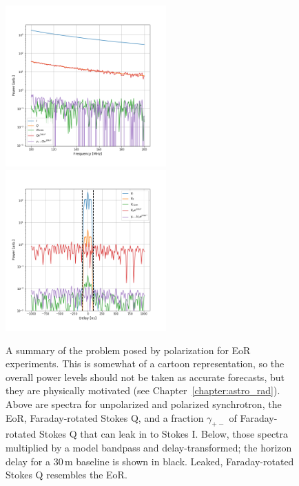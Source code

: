 \begin{figure}
\centering
\includegraphics[width=0.55\textwidth]{chapters/eor_window_theory/figures/vis_divBp_1pctDIleak_RM500.png}
\includegraphics[width=0.55\textwidth]{chapters/eor_window_theory/figures/dly_1pctDIleak_RM500.png}
\caption[A summary of the problem posed by polarization for EoR experiments.]{A summary of the problem posed by polarization for EoR experiments. This is somewhat of a cartoon representation, so the overall power levels should not be taken as accurate forecasts, but they are physically motivated (see Chapter~\ref{chapter:astro_rad}). Above are spectra for unpolarized and polarized synchrotron, the EoR, Faraday-rotated Stokes Q, and a fraction $\gamma_{+-}$ of Faraday-rotated Stokes Q that can leak in to Stokes I. Below, those spectra multiplied by a model bandpass and delay-transformed; the horizon delay for a 30\,m baseline is shown in black. Leaked, Faraday-rotated Stokes Q resembles the EoR.}
\end{figure}



